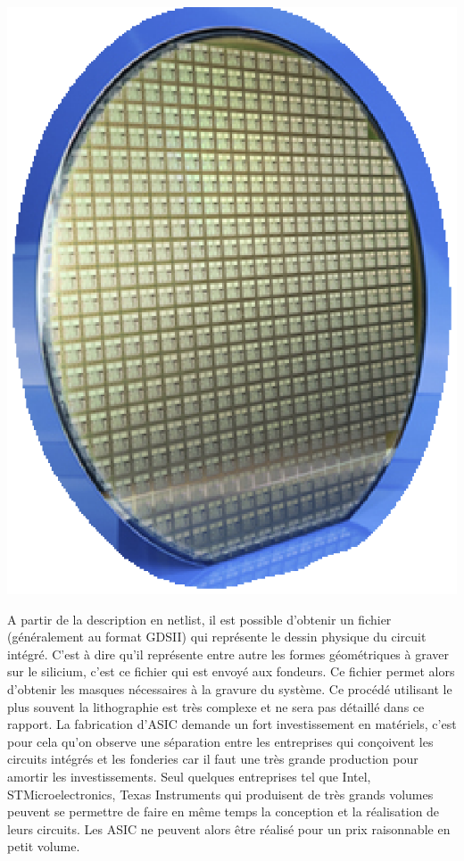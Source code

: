 \begin{center}
\includegraphics[scale=0.4]{asic.eps}
\end{center}

A partir de la description en netlist, il est possible d'obtenir un fichier
(généralement au format GDSII) qui représente le dessin physique du circuit intégré.
C'est à dire qu'il représente entre autre les formes géométriques à graver sur le
silicium, c'est ce fichier qui est envoyé aux fondeurs. Ce fichier permet alors
d'obtenir les masques nécessaires à la gravure du système. Ce procédé utilisant le
plus souvent la lithographie est très complexe et ne sera pas détaillé dans ce
rapport. La fabrication d'ASIC demande un fort investissement en matériels, c'est
pour cela qu'on observe une séparation entre les entreprises qui conçoivent les
circuits intégrés et les fonderies car il faut une très grande production pour
amortir les investissements. Seul quelques entreprises tel que Intel,
STMicroelectronics, Texas Instruments qui produisent de très grands volumes peuvent
se permettre de faire en même temps la conception et la réalisation de leurs
circuits. Les ASIC ne peuvent alors être réalisé pour un prix raisonnable en petit
volume.


